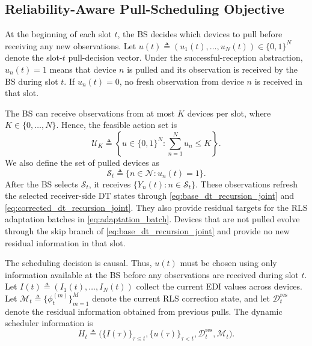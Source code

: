 \documentclass[conference]{IEEEtran}
\begin{document}
\subsection{Reliability-Aware Pull-Scheduling Objective}
\vspace{-0.2mm}
At the beginning of each slot \(t\), the BS decides which devices to pull
before receiving any new observations. Let
\(
u(t) \triangleq (u_1(t),\ldots,u_N(t))\in\{0,1\}^N
\)
denote the slot-\(t\) pull-decision vector. Under the successful-reception
abstraction, \(u_n(t)=1\) means that device \(n\) is pulled and its
observation is received by the BS during slot \(t\). If \(u_n(t)=0\), no
fresh observation from device \(n\) is received in that slot.

The BS can receive observations from at most \(K\) devices per slot, where
\(K\in\{0,\ldots,N\}\). Hence, the feasible action set is
\vspace{-2mm}
\begin{equation}
\label{eq:feasible_action_set}
\mathcal U_K
\triangleq
\left\{
u\in\{0,1\}^{N}:
\sum_{n=1}^{N}u_n\le K
\right\}.
\end{equation}
We also define the set of pulled devices as
\vspace{-1.5mm}
\[
\mathcal S_t \triangleq \{n\in\mathcal N:u_n(t)=1\}.
\]
\noindent After the BS selects \(\mathcal S_t\), it receives
\(\{Y_n(t):n\in\mathcal S_t\}\). These observations refresh the selected
receiver-side DT states through \eqref{eq:base_dt_recursion_joint} and
\eqref{eq:corrected_dt_recursion_joint}. They also provide residual targets
for the RLS adaptation batches in \eqref{eq:adaptation_batch}. Devices that
are not pulled evolve through the skip branch of
\eqref{eq:base_dt_recursion_joint} and provide no new residual information
in that slot.

The scheduling decision is causal. Thus, \(u(t)\) must be chosen using only information available at the BS
before any observations are received during slot \(t\). Let
\(I(t)\triangleq(I_1(t),\ldots,I_N(t))\) collect the current EDI values across devices. Let
\(
\mathcal M_t \triangleq \{\phi_t^{(m)}\}_{m=1}^{M}
\)
denote the current RLS correction state, and let
\(\mathcal D_t^{\mathrm{res}}\) denote the residual information obtained
from previous pulls. The dynamic scheduler information is
\vspace{-1.2mm}
\begin{equation}
\label{eq:scheduler_information_reliability}
H_t
\triangleq
\Big(
\{I(\tau)\}_{\tau\le t},
\{u(\tau)\}_{\tau<t},
\mathcal D_t^{\mathrm{res}},
\mathcal M_t
\Big).
\end{equation}
\vspace{-3.9mm}
\end{document}
